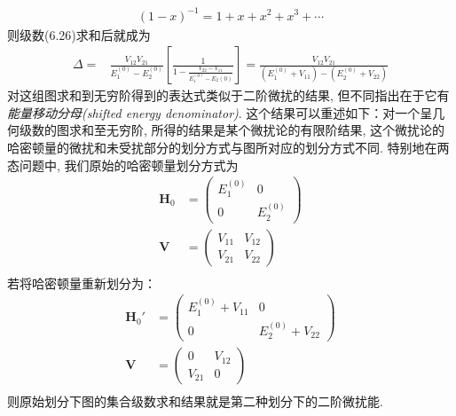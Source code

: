 \begin{align*}
(1-x)^{-1} = 1+x+x^2+x^3+\cdots
\end{align*}
则级数(6.26)求和后就成为
\begin{align}
\Delta = &  \frac{V_{12}V_{21}}{E^{(0)}_1 - E_2^{(0)}}\left[ \frac{1}{1-\frac{V_{22}-V_{11}}{E_1^{(0)} - E_2{(0)}}} \right] = \frac{V_{12}V_{21}}{(E_1^{(0)} + V_{11}) - (E_2^{(0)} + V_{22})}
\end{align}
对这组图求和到无穷阶得到的表达式类似于二阶微扰的结果, 但不同指出在于它有\emph{能量移动分母(shifted energy denominator)}. 这个结果可以重述如下：对一个呈几何级数的图求和至无穷阶, 所得的结果是某个微扰论的有限阶结果, 这个微扰论的哈密顿量的微扰和未受扰部分的划分方式与图所对应的划分方式不同. 特别地在两态问题中, 我们原始的哈密顿量划分方式为
\begin{align*}
\mathbf{H}_0 & = \begin{pmatrix}
E_1^{(0)} & 0 \\
0         & E_2^{(0)}
\end{pmatrix}\\
\mathbf{V} & = \begin{pmatrix}
V_{11} & V_{12} \\
V_{21} & V_{22}
\end{pmatrix}\\
\end{align*} 
若将哈密顿量重新划分为：
\begin{align*}
\mathbf{H}_0' & = \begin{pmatrix}
E_1^{(0)} + V_{11} & 0 \\
0        & E_2^{(0)} + V_{22}
\end{pmatrix}\\
\mathbf{V} & = \begin{pmatrix}
0 & V_{12} \\
V_{21} & 0
\end{pmatrix}\\
\end{align*} 
则原始划分下图的集合级数求和结果就是第二种划分下的二阶微扰能.


